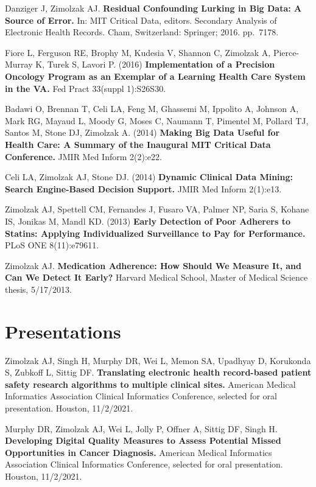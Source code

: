 \documentclass[10pt]{article}
\begin{document}
Danziger J, Zimolzak AJ. \textbf{Residual Confounding Lurking in Big
  Data: A Source of Error.} In: MIT Critical Data, editors. Secondary
Analysis of Electronic Health Records. Cham, Switzerland: Springer;
2016. pp.\ 71\ndash{}78.

Fiore L, Ferguson RE, Brophy M, Kudesia V, Shannon C, Zimolzak A,
Pierce-Murray K, Turek S, Lavori P. (2016) \textbf{Implementation of a
  Precision Oncology Program as an Exemplar of a Learning Health Care
  System in the VA.} Fed Pract 33(suppl 1):S26\ndash{}S30.

Badawi O, Brennan T, Celi LA, Feng M, Ghassemi M, Ippolito A, Johnson
A, Mark RG, Mayaud L, Moody G, Moses C, Naumann T, Pimentel M, Pollard
TJ, Santos M, Stone DJ, Zimolzak A. (2014) \textbf{Making Big Data
  Useful for Health Care: A Summary of the Inaugural MIT Critical Data
  Conference.} JMIR Med Inform 2(2):e22.

Celi LA, Zimolzak AJ, Stone DJ. (2014) \textbf{Dynamic Clinical Data
  Mining: Search Engine-Based Decision Support.} JMIR Med Inform
2(1):e13.

Zimolzak AJ, Spettell CM, Fernandes J, Fusaro VA, Palmer NP, Saria S,
Kohane IS, Jonikas M, Mandl KD. (2013) \textbf{Early Detection of Poor
  Adherers to Statins: Applying Individualized Surveillance to Pay for
  Performance.} PLoS ONE 8(11):e79611.

Zimolzak AJ. \textbf{Medication Adherence: How Should We Measure It,
  and Can We Detect It Early?} Harvard Medical School, Master of
Medical Science thesis, 5/17/2013.




\section*{Presentations} %

Zimolzak AJ, Singh H, Murphy DR, Wei L, Memon SA, Upadhyay D,
Korukonda S, Zubkoff L, Sittig DF. \textbf{Translating electronic
  health record-based patient safety research algorithms to multiple
  clinical sites.} American Medical Informatics Association Clinical
Informatics Conference, selected for oral presentation. Houston,
11/2/2021.

Murphy DR, Zimolzak AJ, Wei L, Jolly P, Offner A, Sittig DF, Singh H.
\textbf{Developing Digital Quality Measures to Assess Potential Missed
  Opportunities in Cancer Diagnosis.} American Medical Informatics
Association Clinical Informatics Conference, selected for oral
presentation. Houston, 11/2/2021.
\end{document}
